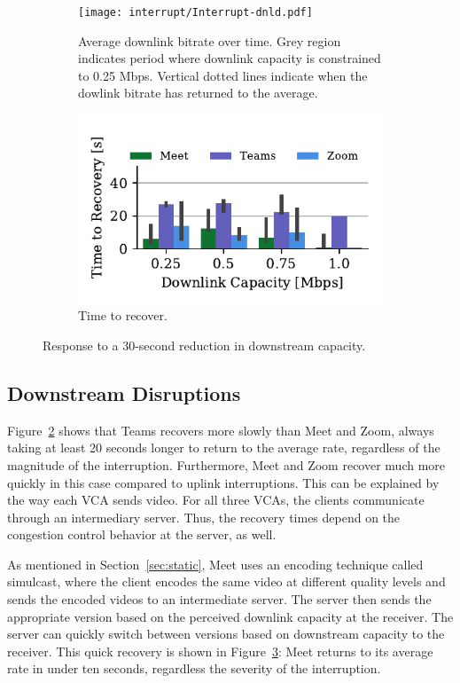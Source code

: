 \begin{figure}[t!]
 \centering
\begin{subfigure}[t]{.5\textwidth}
   \centering
    \texttt{[image: interrupt/Interrupt-dnld.pdf]}
    \caption{Average downlink bitrate over time. Grey region indicates period where downlink capacity is constrained to 0.25 Mbps. Vertical dotted lines indicate when the dowlink bitrate has returned to the average.}
    \label{fig:ts-dnld}
\end{subfigure}
\begin{subfigure}[t]{.5\textwidth}
  \centering
    \includegraphics[width=.7\textwidth,keepaspectratio]{figures/interrupt/TTR-dnld.pdf}
    \caption{Time to recover.}
    \label{fig:TTR_dnld}
\end{subfigure}
\caption{Response to a 30-second reduction in downstream capacity.}
\label{fig:interrupt-dnld}
\end{figure}

\subsection{Downstream Disruptions}

Figure~\ref{fig:TTR_dnld} shows that Teams recovers more slowly than Meet and
Zoom, always taking at least 20 seconds longer to return to the average rate,
regardless of the magnitude of the interruption. Furthermore, Meet and Zoom
recover much more quickly in this case compared to uplink interruptions. This
can be explained by the way each VCA sends video. For all three VCAs, the
clients communicate through an intermediary server. Thus, the recovery times
depend on the congestion control behavior at the server, as well. 

As mentioned in Section~\ref{sec:static}, Meet uses an encoding technique
called simulcast, where the client encodes the same video at different quality
levels and sends the encoded videos to an intermediate server. The server then
sends the appropriate version based on the perceived downlink capacity at the
receiver. The server can quickly switch between versions based on downstream
capacity to the receiver. This quick recovery is shown in
Figure~\ref{fig:interrupt-dnld}: Meet returns to its average rate in under ten
seconds, regardless the severity of the interruption.

